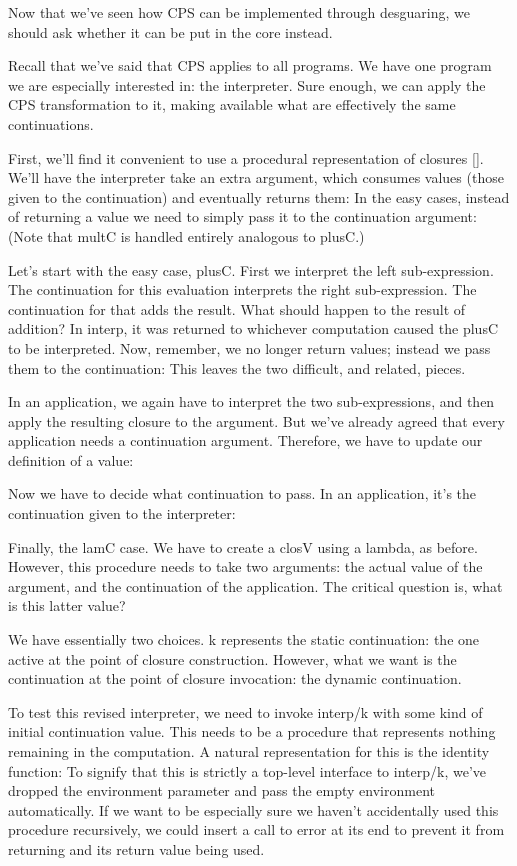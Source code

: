 
Now that we’ve seen how CPS can be implemented through desguaring, we should ask
whether it can be put in the core instead.

Recall that we’ve said that CPS applies to all programs. We have one program we
are especially interested in: the interpreter. Sure enough, we can apply the CPS
transformation to it, making available what are effectively the same
continuations.

First, we’ll find it convenient to use a procedural representation of closures
\ref{}. We’ll have the interpreter take an extra argument, which consumes values
(those given to the continuation) and eventually returns them:
In the easy cases, instead of returning a value we need to simply pass it to the
continuation argument:
(Note that multC is handled entirely analogous to plusC.)

Let’s start with the easy case, plusC. First we interpret the left
sub-expression. The continuation for this evaluation interprets the right
sub-expression. The continuation for that adds the result. What should happen to
the result of addition? In interp, it was returned to whichever computation
caused the plusC to be interpreted. Now, remember, we no longer return values;
instead we pass them to the continuation:
This leaves the two difficult, and related, pieces.

In an application, we again have to interpret the two sub-expressions, and then
apply the resulting closure to the argument. But we’ve already agreed that every
application needs a continuation argument. Therefore, we have to update our
definition of a value:

Now we have to decide what continuation to pass. In an application, it’s the
continuation given to the interpreter:

Finally, the lamC case. We have to create a closV using a lambda, as before.
However, this procedure needs to take two arguments: the actual value of the
argument, and the continuation of the application. The critical question is,
what is this latter value?

We have essentially two choices. k represents the static continuation: the one
active at the point of closure construction. However, what we want is the
continuation at the point of closure invocation: the dynamic continuation.

To test this revised interpreter, we need to invoke interp/k with some kind of
initial continuation value. This needs to be a procedure that represents nothing
remaining in the computation. A natural representation for this is the identity
function:
To signify that this is strictly a top-level interface to interp/k, we’ve
dropped the environment parameter and pass the empty environment automatically.
If we want to be especially sure we haven’t accidentally used this procedure
recursively, we could insert a call to error at its end to prevent it from
returning and its return value being used.
